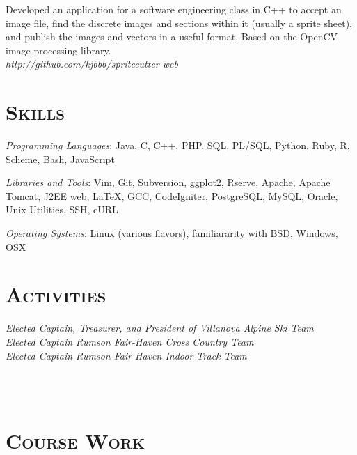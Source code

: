 \begin{resume}
\begin{position}
Developed an application for a software engineering class in C++ to accept an
image file, find the discrete images and sections within it (usually a sprite
sheet), and publish the images and vectors in a useful format. Based on the
OpenCV image processing library. \\
{\itshape http://github.com/kjbbb/spritecutter-web}
\end{position}


\section{\textsc{Skills}}

\emph{Programming Languages}: Java, C, C++, PHP, SQL, PL/SQL, Python, Ruby, R,
Scheme, Bash, JavaScript

\emph{Libraries and Tools}: Vim, Git, Subversion, ggplot2, Rserve, Apache,
Apache Tomcat, J2EE web, LaTeX, GCC, CodeIgniter, PostgreSQL, MySQL,
Oracle, Unix Utilities, SSH, cURL

\emph{Operating Systems}: Linux (various flavors), familiararity with BSD,
Windows, OSX


\section{\textsc{Activities}}

\emph{Elected Captain, Treasurer, and President of Villanova Alpine Ski Team} \\
\emph{Elected Captain Rumson Fair-Haven Cross Country Team} \\
\emph{Elected Captain Rumson Fair-Haven Indoor Track Team} \\

\begin{formatb}
  \\
  \body\\
\end{formatb}



\section{\textsc{Course Work}}
  \begin{tabular}{lllll}


\end{tabular}
\end{resume}
